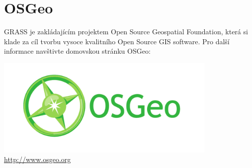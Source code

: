 \documentclass[notumble,a4paper,10pt,nofoldmark]{leaflet}
\begin{document}
\vfill
\section{OSGeo}

GRASS je zakládajícím projektem Open Source Geospatial Foundation, která si klade za cíl tvorbu vysoce kvalitního Open Source GIS software. Pro další informace navštivte domovskou stránku OSGeo:
\begin{center}
\includegraphics[width=0.8\textwidth]{OSGeo_CMYK}\\
\url{http://www.osgeo.org}
\end{center}
\end{document}

